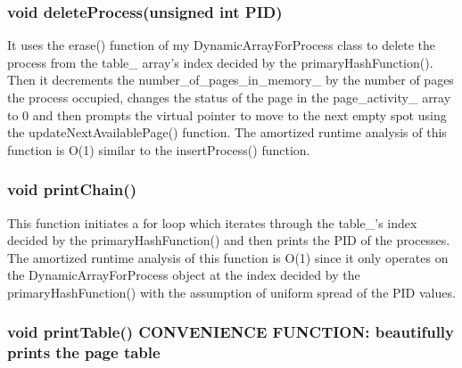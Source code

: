 \documentclass[a4paper]{article}
\begin{document}
    \subsubsection{{\color{orange}void} {\color{draculapurple}deleteProcess}({\color{orange}unsigned int} PID)}
    It uses the {\color{draculapurple}erase()} function of my {\color{draculapurple}DynamicArrayForProcess} class to delete the process from the {\color{Turquoise}table\_} array's index decided by the {\color{draculapurple}primaryHashFunction()}.
    Then it decrements the {\color{Turquoise}number\_of\_pages\_in\_memory\_} by the number of pages the process
    occupied, changes the status of the page in the {\color{Turquoise}page\_activity\_} array to {\color{LightPink}0} and
    then prompts the virtual pointer to move to the next empty spot using the {\color{draculapurple}updateNextAvailablePage()} function.
    The amortized runtime analysis of this function is {\color{lightblue}O(1)} similar to the {\color{draculapurple}insertProcess()} function.

    \subsubsection{{\color{orange}void} {\color{draculapurple}printChain}()}
    This function initiates a for loop which iterates through the {\color{Turquoise}table\_}'s index
    decided by the {\color{draculapurple}primaryHashFunction()} and then prints the {\color{draculapurple}PID} of the processes.
    The amortized runtime analysis of this function is {\color{lightblue}O(1)} since it only operates on the
            {\color{Turquoise}DynamicArrayForProcess} object at the index decided by the {\color{draculapurple}primaryHashFunction()}
    with the assumption of uniform spread of the {\color{draculapurple}PID} values.

    \subsubsection{{\color{orange}void} {\color{draculapurple}printTable}() {\color{Awesome}CONVENIENCE FUNCTION:} {\color{yellow}beautifully prints the page table}}
\end{document}
